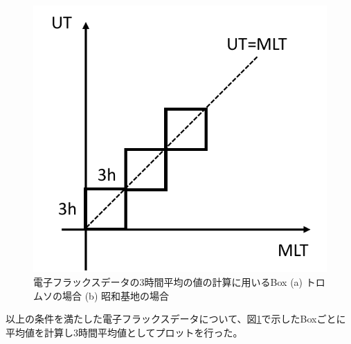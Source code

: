 \begin{enumerate}
\begin{figure}[htbp]
\begin{minipage}{.495\linewidth}
        \end{minipage}
        \begin{minipage}{.495\linewidth}
            \centering
            \includegraphics[scale=0.5]{master_thesis_contents/master_thesis_fig/app_poes_box_syowa.pdf}
        \end{minipage}
        \caption{電子フラックスデータの3時間平均の値の計算に用いるBox (a) トロムソの場合 (b) 昭和基地の場合}
        \label{fig:app_poes_box}
    \end{figure}
\end{enumerate} \par
以上の条件を満たした電子フラックスデータについて、図\ref{fig:app_poes_box}で示したBoxごとに平均値を計算し3時間平均値としてプロットを行った。


